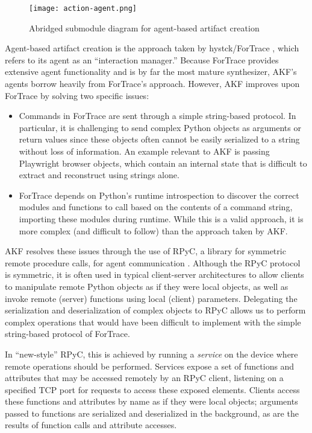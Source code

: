 \begin{figure*}[htbp]
\centering
\texttt{[image: action-agent.png]}
\caption{Abridged submodule diagram for agent-based artifact
creation}\label{fig:action-agent}
\end{figure*}

Agent-based artifact creation is the approach taken by hystck/ForTrace
\cite{gobelNovelApproachGenerating2020,gobelForTraceHolisticForensic2022},
which refers to its agent as an ``interaction manager.'' Because
ForTrace provides extensive agent functionality and is by far the most
mature synthesizer, AKF's agents borrow heavily from ForTrace's
approach. However, AKF improves upon ForTrace by solving two specific
issues:

\begin{itemize}
\item
  Commands in ForTrace are sent through a simple string-based protocol.
  In particular, it is challenging to send complex Python objects as
  arguments or return values since these objects often cannot be easily
  serialized to a string without loss of information. An example
  relevant to AKF is passing Playwright browser objects, which contain
  an internal state that is difficult to extract and reconstruct using
  strings alone.
\item
  ForTrace depends on Python's runtime introspection to discover the
  correct modules and functions to call based on the contents of a
  command string, importing these modules during runtime. While this is
  a valid approach, it is more complex (and difficult to follow) than
  the approach taken by AKF.
\end{itemize}

AKF resolves these issues through the use of RPyC, a library for
symmetric remote procedure calls, for agent communication
\cite{TomerfilibaorgRpyc2025}. Although the RPyC protocol is
symmetric, it is often used in typical client-server architectures to
allow clients to manipulate remote Python objects as if they were local
objects, as well as invoke remote (server) functions using local
(client) parameters. Delegating the serialization and deserialization of
complex objects to RPyC allows us to perform complex operations that
would have been difficult to implement with the simple string-based
protocol of ForTrace.

In ``new-style'' RPyC, this is achieved by running a \emph{service} on
the device where remote operations should be performed. Services expose
a set of functions and attributes that may be accessed remotely by an
RPyC client, listening on a specified TCP port for requests to access
these exposed elements. Clients access these functions and attributes by
name as if they were local objects; arguments passed to functions are
serialized and deserialized in the background, as are the results of
function calls and attribute accesses.

